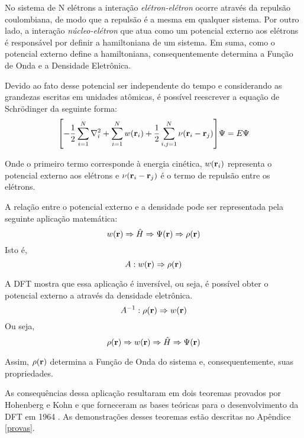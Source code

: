 No sistema de N elétrons a interação \textit{elétron-elétron} ocorre através da repulsão coulombiana, de modo que a repulsão é a mesma em qualquer sistema. Por outro lado, a interação \textit{núcleo-elétron} que atua como um potencial externo aos elétrons é responsável por definir a hamiltoniana de um sistema. Em suma, como o potencial externo define a hamiltoniana, consequentemente determina a Função de Onda e a Densidade Eletrônica.


Devido ao fato desse potencial ser independente do tempo e considerando as grandezas escritas em unidades atômicas, é possível reescrever a equação de Schr\"{o}dinger da seguinte forma:
\begin{equation}\label{eq:ham_ind_time}
	\bqty{-\frac{1}{2}\sum_{i=1}^{N}\laplacian_i+\sum_{i=1}^{N} w(\vb{r}_i)+\frac{1}{2}\sum_{i,j=1}^{N}\nu(\vb{r}_i-\vb{r}_j)} \Psi = E \Psi
\end{equation}

Onde o primeiro termo corresponde à energia cinética, $ w(\vb{r}_i) $ representa o potencial externo aos elétrons e $ \nu(\vb{r}_i-\vb{r}_j) $ é o termo de repulsão entre os elétrons.

A relação entre o potencial externo e a densidade pode ser representada pela seguinte aplicação matemática:
\begin{equation}
	w(\vb{r})\Rightarrow \hat{H} \Rightarrow \Psi(\vb{r}) \Rightarrow\rho(\vb{r})
\end{equation}
Isto é, 
\begin{equation}
	A: w(\vb{r}) \Rightarrow \rho(\vb{r})
\end{equation}

A DFT mostra que essa aplicação é inversível, ou seja, é possível obter o potencial externo a através da densidade eletrônica.
\begin{equation}
	A^{-1}:\rho(\vb{r}) \Rightarrow w(\vb{r})
\end{equation} 
Ou seja,
\begin{equation}
	\rho(\vb{r}) \Rightarrow w(\vb{r}) \Rightarrow \hat{H} \Rightarrow \Psi(\vb{r})
\end{equation}

Assim, $ \rho(\vb{r}) $ determina a Função de Onda do sistema e, consequentemente, suas propriedades. 

As consequências dessa aplicação resultaram em dois teoremas provados por Hohenberg e Kohn e que forneceram as bases teóricas para o desenvolvimento da DFT em 1964 \cite{dft_originals}. As demonstrações desses teoremas estão descritas no Apêndice \ref{provas}.

